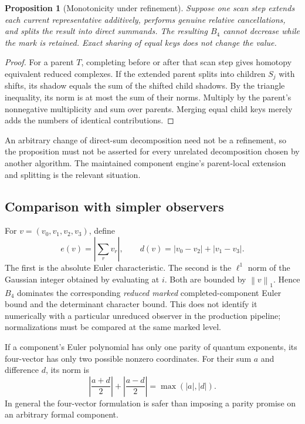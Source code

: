 \documentclass[11pt]{article}
\newtheorem{proposition}[theorem]{Proposition}
\theoremstyle{definition}
\theoremstyle{remark}
\newcommand{\norm}[1]{\left\lVert#1\right\rVert_1}
\begin{document}
\begin{proposition}[Monotonicity under refinement]\label{prop:monotone}
Suppose one scan step extends each current representative additively,
performs genuine relative cancellations, and splits the result into direct
summands. The resulting $B_4$ cannot decrease while the mark is retained.
Exact sharing of equal keys does not change the value.
\end{proposition}
\begin{proof}
For a parent $T$, completing before or after that scan step gives homotopy
equivalent reduced complexes. If the extended parent splits into children
$S_j$ with shifts, its shadow equals the sum of the shifted child shadows.
By the triangle inequality, its norm is at most the sum of their norms.
Multiply by the parent's nonnegative multiplicity and sum over parents.
Merging equal child keys merely adds the numbers of identical contributions.
\end{proof}

An arbitrary change of direct-sum decomposition need not be a refinement,
so the proposition must not be asserted for every unrelated decomposition
chosen by another algorithm. The maintained component engine's parent-local
extension and splitting is the relevant situation.

\subsection{Comparison with simpler observers}
For $v=(v_0,v_1,v_2,v_3)$, define
\[
 e(v)=\left|\sum_r v_r\right|,
 \qquad d(v)=|v_0-v_2|+|v_1-v_3|.
\]
The first is the absolute Euler characteristic. The second is the
$\ell^1$ norm of the Gaussian integer obtained by evaluating at $i$.
Both are bounded by $\norm{v}$. Hence $B_4$ dominates the corresponding
\emph{reduced marked} completed-component Euler bound and the determinant
character bound. This does not identify it numerically with a particular
unreduced observer in the production pipeline; normalizations must be
compared at the same marked level.

If a component's Euler polynomial has only one parity of quantum exponents,
its four-vector has only two possible nonzero coordinates. For their sum
$a$ and difference $d$, its norm is
\begin{equation}\label{eq:max}
 \left|\frac{a+d}{2}\right|+
 \left|\frac{a-d}{2}\right|=\max(|a|,|d|).
\end{equation}
In general the four-vector formulation is safer than imposing a parity
promise on an arbitrary formal component.
\end{document}
